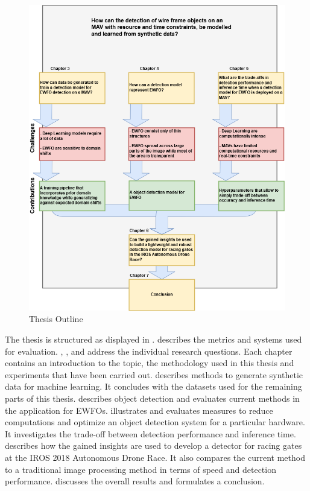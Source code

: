 \begin{figure}[hbtp]
	\centering
	\includegraphics[width=\textwidth]{fig/outline}
	\caption{Thesis Outline}
	\label{fig:outline}
\end{figure}


The thesis is structured as displayed in .  describes the metrics and systems used for evaluation. , ,  and  address the individual research questions. Each chapter contains an introduction to the topic, the methodology used in this thesis and experiments that have been carried out.  describes methods to generate synthetic data for machine learning. It concludes with the datasets used for the remaining parts of this thesis.   describes object detection and evaluates current methods in the application for \acp{EWFO}.  illustrates and evaluates measures to reduce computations and optimize an object detection system for a particular hardware. It investigates the trade-off between detection performance and inference time.  describes how the gained insights are used to develop a detector for racing gates at the \ac{IROS} 2018 Autonomous Drone Race. It also compares the current method to a traditional image processing method in terms of speed and detection performance.  discusses the overall results and formulates a conclusion.



